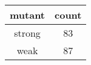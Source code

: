 
\begin{tabular}{cc}
\toprule
mutant & count\\
\midrule
strong & 83\\
weak & 87\\
\bottomrule
\end{tabular}
